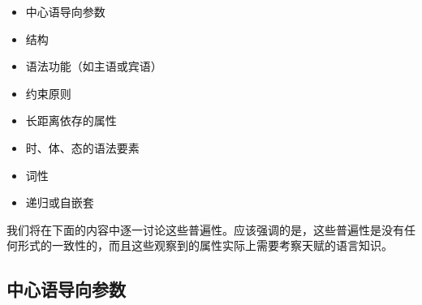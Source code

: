 \begin{itemize}
\item 中心语导向参数
\item \xbar 结构
\item 语法功能（如主语或宾语）
\item 约束原则
\item 长距离依存的属性
\item 时、体、态的语法要素
\item 词性
\item 递归或自嵌套
\end{itemize}

\noindent
我们将在下面的内容中逐一讨论这些普遍性。应该强调的是，这些普遍性是没有任何形式的一致性的，而且这些观察到的属性实际上需要考察天赋的语言知识。

\subsection{中心语导向参数}
\label{Abschnitt-Kopfstellungsparameter}

